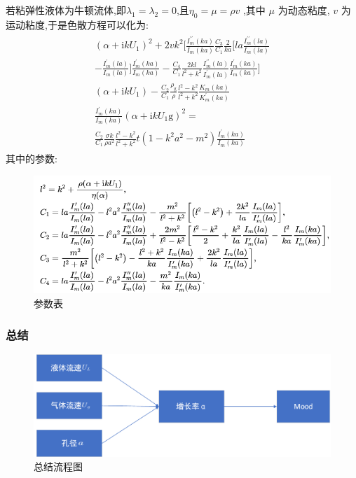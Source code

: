 \documentclass[UTF8]{gapd}
\begin{document}
若粘弹性液体为牛顿流体,即$\lambda _1=\lambda _2=0$,且$ \eta _0=\mu =\rho v $ ,其中 $\mu$  为动态粘度, $v$   为运动粘度,于是色散方程可以化为:
\begin{equation}
\begin{gathered}
\begin{split}
(\alpha+\mathrm{i} k {U}_{1})^{2}+2 v k^{2}[\frac{I_{m}^{\prime \prime}(k a)}{I_{m}(k a)}\frac{C_{3}}{C_{1}} \frac{2}{k a}
[l a \frac{I_{m}^{\prime \prime}(l a)}{I_{m}(l a)}\\
-\frac{I_{m}^{\prime}(l a)}{I_{m}(l a)}] \frac{I_{m}^{\prime}(k a)}{I_{m}(k a)}
-\frac{C_{4}}{C_{1}} \frac{2 k l}{l^{2}+k^{2}} \frac{I_{m}^{\prime \prime}(l a)}{I_{m}^{\prime}(l a)} \frac{I_{m}^{\prime}(k a)}{I_{m}(k a)}]
\\(\alpha+\mathrm{i} k {U}_{1}) 
-\frac{C_{2}}{C_{1}} \frac{\rho_{\mathrm{g}}}{\rho} \frac{l^{2}-k^{2}}{l^{2}+k^{2}} \frac{K_{m}(k a)}{K_{m}^{\prime}(k a)}\\
 \frac{I_{m}^{\prime}(k a)}{I_{m}(k a)}\left(\alpha+\mathrm{i} k {U}_{1}{\mathrm{g}}\right)^{2}=\\
\frac{C_{2}}{C_{1}} \frac{\sigma k}{\rho a^{2}} \frac{l^{2}-k^{2}}{l^{2}+k^{2}}t(1-k^{2} a^{2}-m^{2}) \frac{I_{m}^{\prime}(k a)}{I_{m}(k a)} 
\end{split}
\end{gathered}
\end{equation}
其中的参数:
\begin{figure}[!htbp]%
	\centering
	\includegraphics[width=1.2\columnwidth]{images/参数}
	\caption{参数表}
	\label{fig:P2}%
\end{figure}
\subsubsection{总结}
\begin{figure}[h]%
	\centering
	\includegraphics[width=1.2\columnwidth]{images/流程图1}
	\caption{总结流程图}
	\label{fig:P2}%
\end{figure}
\end{document}
